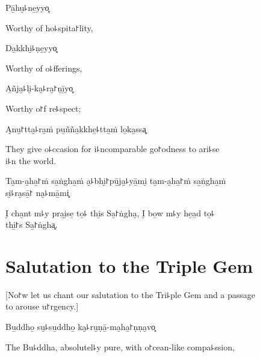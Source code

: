 Pā̱hu̮꜕ne̱yyo͓

\begin{english}
  Worthy of ho꜕spita꜓lity,
\end{english}

\clearpage

Da̱kkhi̮꜕ṇe̱yyo͓

\begin{english}
  Worthy of o꜕fferings,
\end{english}

A̱ñja̮꜕li̮-ka̮꜕ra̮꜓ṇī̱yo͓

\begin{english}
  Worthy o꜓f re꜕spect;
\end{english}

A̮nu̱꜓tta̮꜕ra̱ṁ pu̱ñña̱kkhe̱꜕tta̱ṁ lo̱ka̱ssa͓

\begin{english}
  They give o꜕ccasion for i꜕ncomparable go꜓odness to ari꜕se \\i꜕n the world.
\end{english}

Ta̮m-a̮ha̱꜓ṁ sa̱ṅgha̱ṁ a̮꜕bhi̮꜓pū̱ja̮꜕yā̱mi̮ ta̮m-a̮ha̱꜓ṁ sa̱ṅgha̱ṁ \\si̮꜕ra̮sā̱꜓ na̮꜕mā̱mi͓

\begin{english}
  I̮ cha̱nt m꜕y pra̱i̮se̱ to̱꜕ thi̱s Sa̱꜓ṅgha̮, I̮ bo̱w m꜕y he̱a̱d to̱꜕\\ thi̱꜓s Sa̱꜓ṅgha͓.
\end{english}

\clearpage

\chapter{Salutation to the Triple Gem}

\begin{leader}
\end{leader}

\begin{english}
  [No꜓w let us chant our salutation to the Tri꜕ple Gem and a passage \\to arouse u꜓rgency.]
\end{english}

Bu̱ddho̱ su̮꜕su̱ddho̱ ka̮꜕ru̮ṇā̱-ma̮ha̱꜓ṇṇa̮vo͓

\begin{english}
  The Bu꜕ddha, absolutel꜕y pure, with o꜓cean-like compa꜕ssion,
\end{english}

